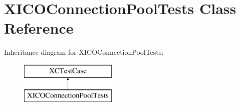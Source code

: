 \hypertarget{interface_x_i_c_o_connection_pool_tests}{}\section{X\+I\+C\+O\+Connection\+Pool\+Tests Class Reference}
\label{interface_x_i_c_o_connection_pool_tests}
Inheritance diagram for X\+I\+C\+O\+Connection\+Pool\+Tests\+:\begin{figure}[H]
\begin{center}
\leavevmode
\includegraphics[height=2.000000cm]{interface_x_i_c_o_connection_pool_tests}
\end{center}
\end{figure}
